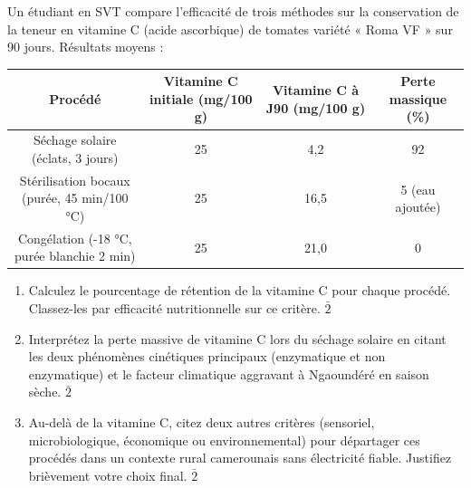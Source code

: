 \documentclass[11pt]{article}
\begin{document}
\begin{exercice}
Un étudiant en SVT compare l'efficacité de trois méthodes sur la conservation de la teneur en vitamine C (acide ascorbique) de tomates variété « Roma VF » sur 90 jours. Résultats moyens :

\begin{center}
\begin{tabular}{|c|c|c|c|}
\hline
\textbf{Procédé} & \textbf{Vitamine C initiale (mg/100 g)} & \textbf{Vitamine C à J90 (mg/100 g)} & \textbf{Perte massique (\%)} \\
\hline
Séchage solaire (éclats, 3 jours) & 25 & 4,2 & 92 \\
Stérilisation bocaux (purée, 45 min/100 °C) & 25 & 16,5 & 5 (eau ajoutée) \\
Congélation (-18 °C, purée blanchie 2 min) & 25 & 21,0 & 0 \\
\hline
\end{tabular}
\end{center}

\begin{enumerate}
    \item Calculez le pourcentage de rétention de la vitamine C pour chaque procédé. Classez-les par efficacité nutritionnelle sur ce critère. $\bar{2}$
    \item Interprétez la perte massive de vitamine C lors du séchage solaire en citant les deux phénomènes cinétiques principaux (enzymatique et non enzymatique) et le facteur climatique aggravant à Ngaoundéré en saison sèche. $\bar{2}$
    \item Au-delà de la vitamine C, citez deux autres critères (sensoriel, microbiologique, économique ou environnemental) pour départager ces procédés dans un contexte rural camerounais sans électricité fiable. Justifiez brièvement votre choix final. $\bar{2}$
\end{enumerate}
\end{exercice}
\end{document}
